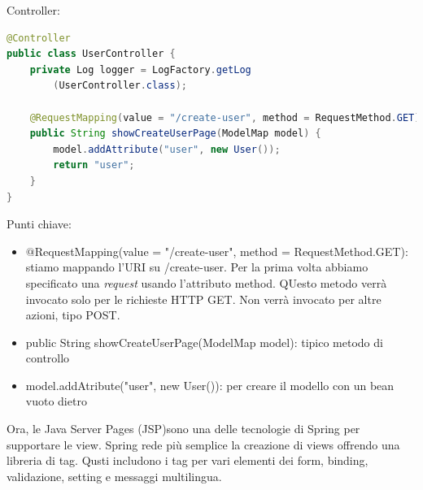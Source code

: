 \documentclass[11pt,a4paper]{book}
\begin{document}
Controller:
\begin{lstlisting}[language = java]
@Controller
public class UserController {
	private Log logger = LogFactory.getLog
		(UserController.class);
		
	@RequestMapping(value = "/create-user",	method = RequestMethod.GET)
	public String showCreateUserPage(ModelMap model) {
		model.addAttribute("user", new User());
		return "user";
	}
}
\end{lstlisting}
Punti chiave:
\begin{itemize}
	\item $@$RequestMapping(value = "/create-user", method = RequestMethod.GET): stiamo mappando l'URI su /create-user. Per la prima volta abbiamo specificato una \emph{request} usando l'attributo method. QUesto metodo verrà invocato solo per le richieste HTTP GET. Non verrà invocato per altre azioni, tipo POST.
	\item public String showCreateUserPage(ModelMap model): tipico metodo di controllo
	\item model.addAtribute("user", new User()): per creare il modello con un bean vuoto dietro
\end{itemize}
Ora, le Java Server Pages (JSP)sono una delle tecnologie di Spring per supportare le view. Spring rede più semplice la creazione di views offrendo una libreria di tag. Qusti includono i tag per vari elementi dei form, binding, validazione, setting e messaggi multilingua.
\end{document}
